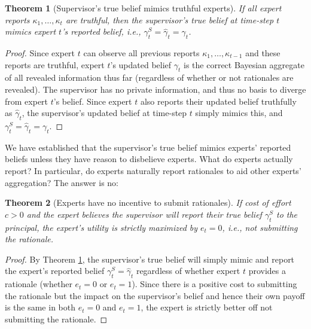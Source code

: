 \documentclass{winnower}
\newtheorem{theorem}{Theorem}
\begin{document}
\begin{theorem}[Supervisor's true belief mimics truthful experts]\label{lem:mimic}
    If all expert reports $\kappa_1, \ldots, \kappa_t$ are truthful, then the supervisor's true belief at time-step $t$ mimics expert $t$'s reported belief, i.e., $\gamma_t^S = \hat{\gamma}_t = \gamma_t$.
\end{theorem}

\begin{proof}
    Since expert $t$ can observe all previous reports $\kappa_1, \ldots, \kappa_{t-1}$ and these reports are truthful, expert $t$'s updated belief $\gamma_t$ is the correct Bayesian aggregate of all revealed information thus far (regardless of whether or not rationales are revealed). The supervisor has no private information, and thus no basis to diverge from expert $t$'s belief. Since expert $t$ also reports their updated belief truthfully as $\hat{\gamma}_t$, the supervisor's updated belief at time-step $t$ simply mimics this, and $\gamma_t^S = \hat{\gamma}_t = \gamma_t$.
\end{proof}

We have established that the supervisor's true belief mimics experts' reported beliefs unless they have reason to disbelieve experts. What do experts actually report? In particular, do experts naturally report rationales to aid other experts' aggregation? The answer is no:

\begin{theorem}[Experts have no incentive to submit rationales]
    If cost of effort $c > 0$ and the expert believes the supervisor will report their true belief $\gamma_t^S$ to the principal, the expert's utility is strictly maximized by $e_t = 0$, i.e., not submitting the rationale.
\end{theorem}

\begin{proof}
    By Theorem \ref{lem:mimic}, the supervisor's true belief will simply mimic and report the expert's reported belief $\gamma_t^S = \hat{\gamma}_t$ regardless of whether expert $t$ provides a rationale (whether $e_t=0$ or $e_t=1$). Since there is a positive cost to submitting the rationale but the impact on the supervisor's belief and hence their own payoff is the same in both $e_t=0$ and $e_t=1$, the expert is strictly better off not submitting the rationale.
\end{proof}
\end{document}
